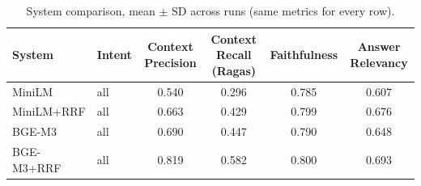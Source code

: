 \begin{table}[t]
\centering
\caption{System comparison, mean $\pm$ SD across runs (same metrics for every row).}
\label{tab:systems-overall}
\begin{tabular}{llcccc}
\toprule
System & Intent & Context Precision & Context Recall (Ragas) & Faithfulness & Answer Relevancy \\
\midrule
MiniLM & all & 0.540 & 0.296 & 0.785 & 0.607 \\
MiniLM+RRF & all & 0.663 & 0.429 & 0.799 & 0.676 \\
BGE-M3 & all & 0.690 & 0.447 & 0.790 & 0.648 \\
BGE-M3+RRF & all & 0.819 & 0.582 & 0.800 & 0.693 \\
\bottomrule
\end{tabular}
\end{table}
